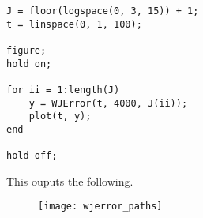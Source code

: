 \documentclass[a4paper] {article}
\begin{document}
\begin{lstlisting}[caption=PlotWJError.m]
J = floor(logspace(0, 3, 15)) + 1;
t = linspace(0, 1, 100);

figure;
hold on;

for ii = 1:length(J)
    y = WJError(t, 4000, J(ii));
    plot(t, y);
end

hold off;
\end{lstlisting}

This ouputs the following.

\begin{figure}[h]
\centering
\texttt{[image: wjerror\_paths]}
\end{figure}
\end{document}
